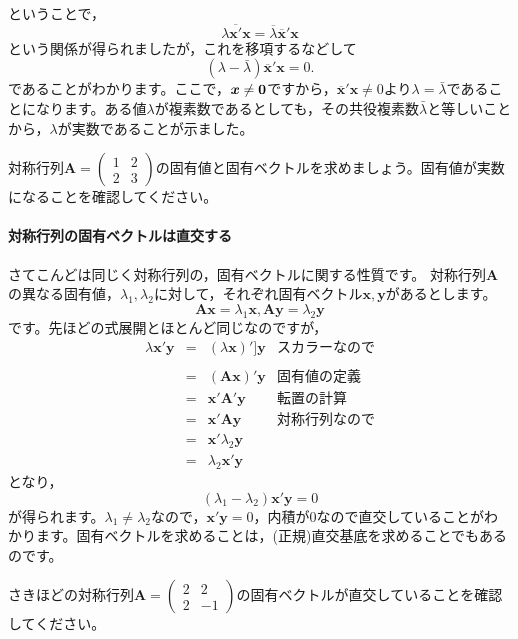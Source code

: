 \documentclass{ltjsbook}
\begin{document}
ということで，
\[ \lambda \overline{\bm{x}'}\bm{x} = \overline{\lambda}\overline{\bm{x}}'\bm{x} \]
という関係が得られましたが，これを移項するなどして
\[
	(\lambda -\bar{\lambda})\overline{\bm{x}}'\bm{x}=0.
\]
であることがわかります。ここで，$\bm{x} \neq \mbox{\boldmath $0$}$ですから，$\overline{\bm{x}}'\bm{x}\neq 0$より$\lambda = \bar{\lambda}$であることになります。ある値$\lambda$が複素数であるとしても，その共役複素数$\bar{\lambda}$と等しいことから，$\lambda$が実数であることが示ました。
\begin{reidai}{}{}
	対称行列$\bm{A} = \begin{pmatrix}1 & 2 \\ 2 & 3 \end{pmatrix}$の固有値と固有ベクトルを求めましょう。固有値が実数になることを確認してください。
\end{reidai}

\paragraph{対称行列の固有ベクトルは直交する}
さてこんどは同じく対称行列の，固有ベクトルに関する性質です。
対称行列$\bm{A}$の異なる固有値，$\lambda_1,\lambda_2$に対して，それぞれ固有ベクトル$\bm{x},\bm{y}$があるとします。
\[ \bm{Ax} = \lambda_1\bm{x},\bm{Ay} = \lambda_2\bm{y}\]
です。先ほどの式展開とほとんど同じなのですが，
\[
	\begin{array}{lllr}
		\lambda\bm{x}'\bm{y} & = & (\lambda \bm{x})']\bm{y} & \mbox{スカラーなので} \\
		                     &   &                          &                \\
		                     & = & (\bm{Ax})'\bm{y}         & \mbox{固有値の定義}  \\
		                     & = & \bm{x}'\bm{A}'\bm{y}     & \mbox{転置の計算}   \\
		                     & = & \bm{x}'\bm{Ay}           & \mbox{対称行列なので} \\
		                     & = & \bm{x}' \lambda_2\bm{y}  &                \\
		                     & = & \lambda_2 \bm{x}'\bm{y}
	\end{array}
\]
となり，
\[ (\lambda_1 - \lambda_2)\bm{x}'\bm{y} =0 \]
が得られます。$\lambda_1 \neq \lambda_2$なので，$\bm{x}'\bm{y} = 0$，内積が0なので直交していることがわかります。固有ベクトルを求めることは，(正規)直交基底を求めることでもあるのです。

\begin{reidai}{}{}
	さきほどの対称行列$\bm{A} = \begin{pmatrix}2 & 2 \\ 2 & -1 \end{pmatrix}$の固有ベクトルが直交していることを確認してください。
\end{reidai}
\end{document}
